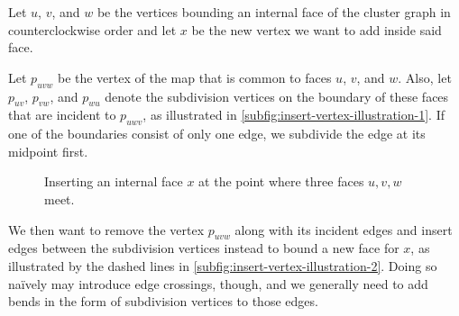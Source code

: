 Let $u$, $v$, and $w$ be the vertices bounding an internal face of the cluster graph in counterclockwise order and let $x$ be the new vertex we want to add inside said face.

Let $p_{uvw}$ be the vertex of the map  that is common to faces $u$, $v$, and $w$.
Also, let $p_{uv}$, $p_{vw}$, and $p_{wu}$ denote the subdivision vertices on the boundary of these faces that are incident to $p_{uwv}$, as illustrated in \cref{subfig:insert-vertex-illustration-1}.
If one of the boundaries consist of only one edge, we subdivide the edge at its midpoint first.

\begin{figure}[H]
	\centering
	\quad
	\quad
	\caption{Inserting an internal face $x$ at the point where three faces $u,v,w$ meet.}
	\label{fig:insert-vertex-illustration}
\end{figure}

We then want to remove the vertex $p_{uvw}$ along with its incident edges and insert edges between the subdivision vertices instead to bound a new face for $x$, as illustrated by the dashed lines in \cref{subfig:insert-vertex-illustration-2}.
Doing so naïvely may introduce edge crossings, though, and we generally need to add bends in the form of subdivision vertices to those edges.

